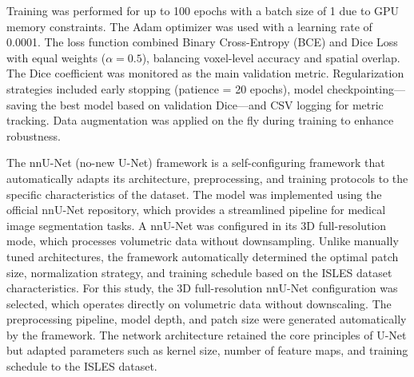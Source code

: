 \documentclass[12pt]{article}
\begin{document}
Training was performed for up to 100 epochs with a batch size of 1 due to GPU memory constraints. The Adam optimizer was used with a learning rate of 0.0001. The loss function combined Binary Cross-Entropy (BCE) and Dice Loss with equal weights ($\alpha = 0.5$), balancing voxel-level accuracy and spatial overlap. The Dice coefficient was monitored as the main validation metric.
%
Regularization strategies included early stopping (patience = 20 epochs), model checkpointing---saving the best model based on validation Dice---and CSV logging for metric tracking. Data augmentation was applied on the fly during training to enhance robustness.


The nnU-Net \cite{Isensee2021} (no-new U-Net) framework is a self-configuring framework that automatically adapts its architecture, preprocessing, and training protocols to the specific characteristics of the dataset. The model was implemented using the official nnU-Net repository, which provides a streamlined pipeline for medical image segmentation tasks. A nnU-Net   was configured in its 3D full-resolution mode, which processes volumetric data without downsampling. Unlike manually tuned architectures, the framework automatically determined the optimal patch size, normalization strategy, and training schedule based on the ISLES dataset characteristics.
%
For this study, the 3D full-resolution nnU-Net configuration was selected, which operates directly on volumetric data without downscaling. The preprocessing pipeline, model depth, and patch size were generated automatically by the framework. The network architecture retained the core principles of U-Net but adapted parameters such as kernel size, number of feature maps, and training schedule to the ISLES dataset.
\end{document}
